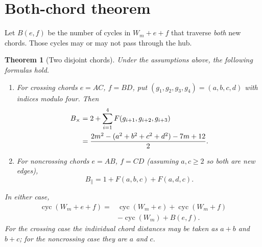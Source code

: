 \documentclass[9pt,a4paper,twocolumn]{extarticle}
\newtheorem{theorem}{Theorem}
\newcommand{\cyc}{\operatorname{cyc}}
\begin{document}
\section{Both-chord theorem}
Let $B(e,f)$ be the number of cycles in $W_m+e+f$ that traverse \emph{both} new chords. Those cycles may or may not pass through the hub.

\begin{theorem}[Two disjoint chords]\label{thm:main}
Under the assumptions above, the following formulas hold.
\begin{enumerate}
\item For crossing chords $e=AC$, $f=BD$, put $(g_1,g_2,g_3,g_4)=(a,b,c,d)$ with indices modulo four. Then
\begin{align}\label{eq:cross}
B_{\times}&=2+\sum_{i=1}^{4}F(g_{i+1},g_{i+2},g_{i+3})\\
&=\frac{2m^2-(a^2+b^2+c^2+d^2)-7m+12}{2}.\notag
\end{align}
\item For noncrossing chords $e=AB$, $f=CD$ (assuming $a,c\geq2$ so both are new edges),
\begin{equation}\label{eq:parallel}
B_{\parallel}=1+F(a,b,c)+F(a,d,c).
\end{equation}
\end{enumerate}
In either case,
\begin{equation}\label{eq:full}
\begin{split}
\cyc(W_m+e+f)={}&\cyc(W_m+e)+\cyc(W_m+f)\\
&-\cyc(W_m)+B(e,f).
\end{split}
\end{equation}
For the crossing case the individual chord distances may be taken as $a+b$ and $b+c$; for the noncrossing case they are $a$ and $c$.
\end{theorem}
\end{document}

